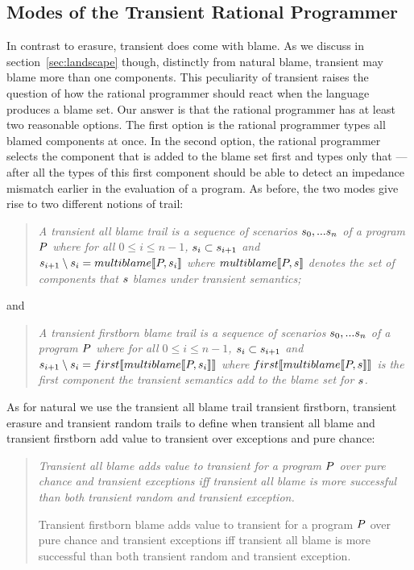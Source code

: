 \subsection{Modes of the Transient Rational Programmer} \label{sub:transient}

In contrast to erasure, transient does come with blame. As we discuss in
section~\ref{sec:landscape} though, distinctly from natural blame,
transient may blame more than one components. This peculiarity of 
transient raises the question of how the rational programmer should react
when the language produces a blame set. Our answer is that the rational
programmer has at least two reasonable options.  The first option is the rational programmer types
all blamed components at once.  In the second option, the rational
programmer selects the component that is added to the blame set first and types
only that --- after all the types of this first component should be able
to  detect an impedance mismatch earlier in the evaluation of a program. 
As before, the two modes give rise to two different notions of trail:
\begin{quote}
\it 
A  transient all blame trail
is a sequence of scenarios $s_0,...s_n$ of a program
$P$ where for all $0 \leq i \leq n - 1$, $s_i \subset s_{i+1}$ and
~$s_{i+1} \setminus s_i = multiblame\llbracket P, s_i\rrbracket$
where $multiblame\llbracket P, s\rrbracket$ denotes the set of components that $s$
blames under transient semantics; 
\end{quote}
\noindent
and
\begin{quote}
\it 
A transient firstborn blame trail
is a sequence of scenarios $s_0,...s_n$ of a program
$P$ where for all $0 \leq i \leq n - 1$, $s_i \subset s_{i+1}$ and
  $s_{i+1} \setminus s_i = first\llbracket multiblame\llbracket P, s_i\rrbracket\rrbracket$
  where $first\llbracket multiblame\llbracket P, s\rrbracket\rrbracket$ is the first component 
  the transient semantics add to the blame set for $s$.
\end{quote}
\noindent As for natural we use the transient all blame trail transient
firstborn, transient erasure and transient random trails to define when
transient all blame and transient firstborn add value to transient over
exceptions and pure chance: 
\begin{quote}
\it 
Transient all blame adds value to transient for a program $P$ over
  pure chance and transient exceptions iff transient all blame 
  is more successful than both transient random and transient exception.

Transient firstborn blame adds value to transient for a program $P$ over
  pure chance and transient exceptions iff transient all blame 
  is more successful than both transient random and transient exception.

\end{quote}

